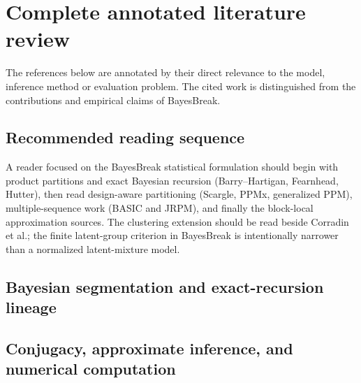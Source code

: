 
\chapter{Complete annotated literature review}
\label{app:annotated-literature}\label{app:annotated-lit}

The references below are annotated by their direct relevance to the model, inference method or evaluation problem. The cited work is distinguished from the contributions and empirical claims of BayesBreak.

\section{Recommended reading sequence}
A reader focused on the BayesBreak statistical formulation should begin with product partitions and exact
Bayesian recursion (Barry--Hartigan, Fearnhead, Hutter), then read design-aware partitioning
(Scargle, PPMx, generalized PPM), multiple-sequence work (BASIC and JRPM), and finally the
block-local approximation sources. The clustering extension should be read beside Corradin et al.;
the finite latent-group criterion in BayesBreak is intentionally narrower than a normalized latent-mixture model.
\section{Bayesian segmentation and exact-recursion lineage}











\section{Conjugacy, approximate inference, and numerical computation}









